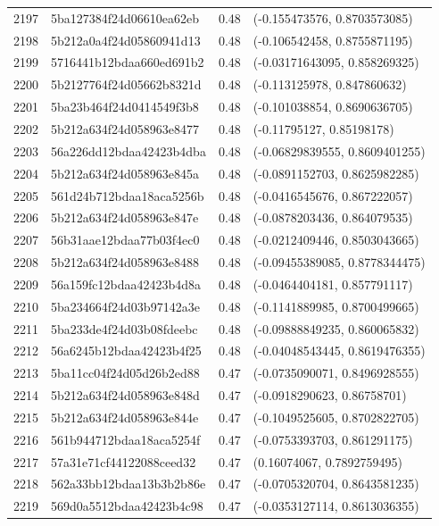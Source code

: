 \begin{table}[ht]
\begin{tabular}{rlrl}
  2197 & 5ba127384f24d06610ea62eb & 0.48 & (-0.155473576, 0.8703573085) \\ 
  2198 & 5b212a0a4f24d05860941d13 & 0.48 & (-0.106542458, 0.8755871195) \\ 
  2199 & 5716441b12bdaa660ed691b2 & 0.48 & (-0.03171643095, 0.858269325) \\ 
  2200 & 5b2127764f24d05662b8321d & 0.48 & (-0.113125978, 0.847860632) \\ 
  2201 & 5ba23b464f24d0414549f3b8 & 0.48 & (-0.101038854, 0.8690636705) \\ 
  2202 & 5b212a634f24d058963e8477 & 0.48 & (-0.11795127, 0.85198178) \\ 
  2203 & 56a226dd12bdaa42423b4dba & 0.48 & (-0.06829839555, 0.8609401255) \\ 
  2204 & 5b212a634f24d058963e845a & 0.48 & (-0.0891152703, 0.8625982285) \\ 
  2205 & 561d24b712bdaa18aca5256b & 0.48 & (-0.0416545676, 0.867222057) \\ 
  2206 & 5b212a634f24d058963e847e & 0.48 & (-0.0878203436, 0.864079535) \\ 
  2207 & 56b31aae12bdaa77b03f4ec0 & 0.48 & (-0.0212409446, 0.8503043665) \\ 
  2208 & 5b212a634f24d058963e8488 & 0.48 & (-0.09455389085, 0.8778344475) \\ 
  2209 & 56a159fc12bdaa42423b4d8a & 0.48 & (-0.0464404181, 0.857791117) \\ 
  2210 & 5ba234664f24d03b97142a3e & 0.48 & (-0.1141889985, 0.8700499665) \\ 
  2211 & 5ba233de4f24d03b08fdeebc & 0.48 & (-0.09888849235, 0.860065832) \\ 
  2212 & 56a6245b12bdaa42423b4f25 & 0.48 & (-0.04048543445, 0.8619476355) \\ 
  2213 & 5ba11cc04f24d05d26b2ed88 & 0.47 & (-0.0735090071, 0.8496928555) \\ 
  2214 & 5b212a634f24d058963e848d & 0.47 & (-0.0918290623, 0.86758701) \\ 
  2215 & 5b212a634f24d058963e844e & 0.47 & (-0.1049525605, 0.8702822705) \\ 
  2216 & 561b944712bdaa18aca5254f & 0.47 & (-0.0753393703, 0.861291175) \\ 
  2217 & 57a31e71cf44122088ceed32 & 0.47 & (0.16074067, 0.7892759495) \\ 
  2218 & 562a33bb12bdaa13b3b2b86e & 0.47 & (-0.0705320704, 0.8643581235) \\ 
  2219 & 569d0a5512bdaa42423b4c98 & 0.47 & (-0.0353127114, 0.8613036355) \\ 

\end{tabular}
\end{table}
